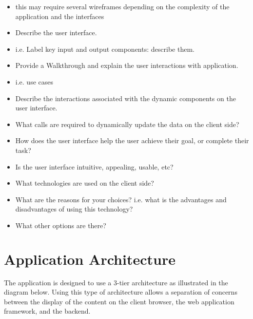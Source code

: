 \documentclass{sig-alt-release2}
\begin{document}

\begin{itemize}
\item	this may require several wireframes depending on the complexity of the application and the interfaces %
\item	Describe the user interface. 
\item	i.e. Label key input and output components: describe them.
\item	Provide a Walkthrough and explain the user interactions with application. %
\item	i.e. use cases
\item	Describe the interactions associated with the dynamic components on the user interface. %
\item	What calls are required to dynamically update the data on the client side?
\item	How does the user interface help the user achieve their goal, or complete their task? 
\item	Is the user interface intuitive, appealing, usable, etc?
\item	What technologies are used on the client side? %
\item	What are the reasons for your choices? i.e. what is the advantages and disadvantages of using this technology? %
\item	What other options are there? %
\end{itemize}

\section{Application Architecture}
The application is designed to use a 3-tier architecture as illustrated in the diagram below. Using this type of architecture allows
a separation of concerns between the display of the content on the client browser, the web application framework, and the backend.
\end{document}
